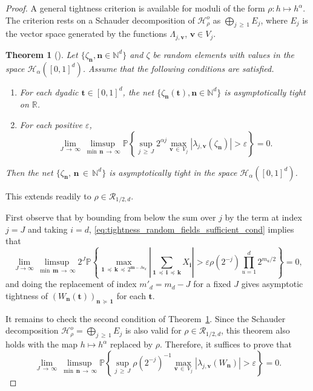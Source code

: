 \documentclass[10pt]{amsart}
\newtheorem{theo}{Theorem}[section]
\theoremstyle{definition}\newtheorem{defi}[theo]{Definition}\newtheorem{rema}[theo]{Remark}\newtheorem{exam}[theo]{Example}\newtheorem{exem}[theo]{Example}\newtheorem{nota}[theo]{Notation}
\newcommand{\Rca}{\mathcal{R}}
\newcommand{\clH}{\mathcal{H}}
\newcommand\R{\mathbb{R}}
\newcommand\N{\mathbb{N}}
\newcommand\PP{\mathbb{P}}
\newcommand\ens[1]{\{ #1\}}
\newcommand{\pr}[1]{(#1)}
\newcommand{\gr}[1]{\bm{#1}}
\newcommand{\gri}{\bm{i}}
\newcommand{\grn}{\bm{n}}
\newcommand{\grm}{\bm{m}}
\newcommand{\grk}{\bm{k}}
\newcommand{\imd}{\preccurlyeq}
\newcommand{\smd}{\succcurlyeq }
\begin{document}
\begin{proof}
A general tightness criterion is available for moduli of the form $\rho\colon h\mapsto h^\alpha$. The criterion rests on a Schauder decomposition of $\clH_\rho^o$ as $\bigoplus_{j\,\geq\,1}E_j$, where $E_j$ is the vector space generated by the functions $\Lambda_{j,\gr{v}}$, $\gr{v}\in V_j$.

\begin{theo}[{\cite[Theorem~6]{MR2340883}}]\label{thm:general_theorem_tightness_H\"older_dim_d}
Let $\ens{\zeta_{\grn},\grn\in \N^d}$ and $\zeta$ be random elements with values in the space $\clH_\alpha([0,1]^d)$. Assume that the following conditions are satisfied.
\begin{enumerate}
\item For each dyadic $\gr{t}\in [0,1]^d$, the net $\ens{\zeta_{\grn}(\gr{t}),
\grn\in \N^d}$ is asymptotically tight on $\R$.
\item For each positive $\varepsilon$,
\begin{equation}
\lim_{J\,\to\,\infty}\limsup_{\min\,\grn\,\to\,\infty}
\PP\left\{\sup_{j\,\geqslant\,J}2^{\alpha j}\max_{\gr{v}\,\in\,V_j}\left|\lambda_{j,
\gr{v}}(\zeta_{\grn}) \right|>\varepsilon\right\}=0.
\end{equation}
\end{enumerate}
Then the net $\ens{\zeta_{\grn},\,\grn\,\in\,\N^d}$ is asymptotically tight in the space $\clH_\alpha([0,1]^d)$.
\end{theo}

This extends readily to $\rho\in\Rca_{1/2,d}$.

First observe that by bounding from below the sum over $j$ by the term at index $j=J$ and taking $i=d$, \eqref{eq:tightness_random_fields_sufficient_cond} implies that
\begin{equation}
\lim_{J\to \infty}\limsup_{\min\,\grm\,\to\,\infty} 2^J \PP\left\{\max_{\gr{1}\,\imd\,\gr{k}\,\imd\,2^{\grm -J\gr{e}_d } }
\left|\sum_{\gr{1}\,\imd\,\gri\,\imd\,\grk} X_{\gri} \right|> \varepsilon\rho\left(2^{-j}\right)
\prod_{u=1}^d2^{m_u/2}\right\}=0,
\end{equation}
and doing the replacement of index $m'_d=m_d-J$ for a fixed $J$ gives asymptotic tightness of $ \pr{W_{\grn}\pr{\gr{t}}}_{\grn\,\smd\,\gr{1}}$ for each $\gr{t}$.

It remains to check the second condition of Theorem~\ref{thm:general_theorem_tightness_H\"older_dim_d}. Since the Schauder decomposition $\clH_\rho^o=
\bigoplus_{j\,\geq\,1}E_j$ is also valid for $\rho\in\Rca_{1/2,d}$, this theorem also holds with the map $h\mapsto h^\alpha$ replaced by $\rho$. Therefore, it suffices to prove that
\begin{equation}\label{eq:step_for_tightness}
\lim_{J\,\to\,\infty}\limsup_{\min\,\grn\,\to\,\infty}
\PP\left\{\sup_{j\,\geqslant\,J} \rho\left(2^{-j}\right)^{-1}\max_{\gr{v}\,\in\,V_j}\left|\lambda_{j,
\gr{v}}\left(W_{\grn}\right) \right|>\varepsilon \right\}=0.
\end{equation}



\end{proof}
\end{document}
